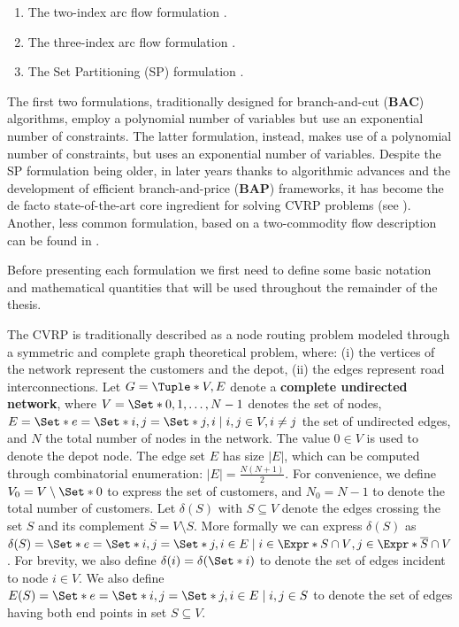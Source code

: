 \begin{enumerate}
	\setlength{\itemsep}{0pt}
	\setlength{\parskip}{0pt}

	\item The two-index arc flow formulation \parencite{laporte1983, laporte1985, laporte1986}.
	\item The three-index arc flow formulation \parencite{golden1977}.
	\item The Set Partitioning (SP) formulation \parencite{balinski1964}.
\end{enumerate}

The first two formulations, traditionally designed
for branch-and-cut (\textbf{BAC}) algorithms, employ a polynomial number of variables
but use an exponential number of constraints.
The latter formulation, instead, makes use of a polynomial number of constraints,
but uses an exponential number of variables.
Despite the SP formulation being older, in later years thanks to algorithmic advances
and the development of efficient branch-and-price (\textbf{BAP}) frameworks, it has become the de facto
state-of-the-art core ingredient for solving CVRP problems (see \cite{pessoa2020}).
Another, less common formulation, based on a two-commodity flow description
can be found in \textcite{baldacci2004}.


\medskip
Before presenting each formulation we first need to define some basic notation
and mathematical quantities that will be used throughout the remainder of the thesis.

The CVRP is traditionally described as a node routing problem modeled through a symmetric and complete graph theoretical problem,
where: (i) the vertices of the network represent the customers and the depot,
(ii) the edges represent road interconnections.
Let $G = \Tuple*{V, E}$ denote a \textbf{complete undirected network}, where $V = \Set*{0, 1, \dots, N - 1}$ denotes the set of nodes,
$E = \Set*{e = \Set*{i, j} = \Set*{j, i} \mid \allowbreak i,j \in V, \allowbreak i \ne j}$ the set of undirected edges,
and $N$ the total number of nodes in the network.
The value $0 \in V$ is used to denote the depot node.
The edge set $E$ has size $|E|$, which can be computed through combinatorial enumeration: $|E| = \frac{N (N+1)}{2}$.
For convenience, we define $V_0 = V \setminus \Set*{0}$ to express the set of customers,
and $N_0 = N - 1$ to denote the total number of customers.
Let $\delta(S)$ with $S \subseteq V$ denote the edges crossing the set $S$ and its complement $\overline{S} = V \setminus S$.
More formally we can express $\delta(S)$ as $\delta(S) = \Set*{ e = \Set*{i, j} = \Set*{j, i} \in E \mid i \in \Expr*{S \cap V}, j \in \Expr*{ \overline{S} \cap V } }$.
For brevity, we also define $\delta(i) = \delta(\Set*{i})$ to denote the set of edges incident to node $i \in V$.
We also define $E(S) = \Set*{e = \Set*{i, j} = \Set*{j, i}\in E \mid i, j \in S}$ to denote the set of edges having both end points in set $S \subseteq V$.

